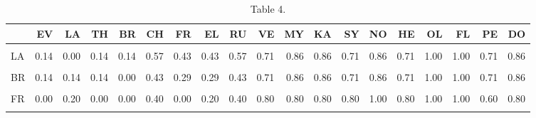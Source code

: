\begin{table}[H]

\caption{Table 4.}
\centering
\fontsize{8}{10}\selectfont
\begin{tabular}[t]{lrrrrrrrrrrrrrrrrrr}
\toprule
  & EV & LA & TH & BR & CH & FR & EL & RU & VE & MY & KA & SY & NO & HE & OL & FL & PE & DO\\
\midrule
\cellcolor{gray!6}{EV} & \cellcolor{gray!6}{0.00} & \cellcolor{gray!6}{0.25} & \cellcolor{gray!6}{0.12} & \cellcolor{gray!6}{0.25} & \cellcolor{gray!6}{0.62} & \cellcolor{gray!6}{0.38} & \cellcolor{gray!6}{0.50} & \cellcolor{gray!6}{0.50} & \cellcolor{gray!6}{0.75} & \cellcolor{gray!6}{0.75} & \cellcolor{gray!6}{0.75} & \cellcolor{gray!6}{0.75} & \cellcolor{gray!6}{0.88} & \cellcolor{gray!6}{0.88} & \cellcolor{gray!6}{0.88} & \cellcolor{gray!6}{0.88} & \cellcolor{gray!6}{0.62} & \cellcolor{gray!6}{0.75}\\
LA & 0.14 & 0.00 & 0.14 & 0.14 & 0.57 & 0.43 & 0.43 & 0.57 & 0.71 & 0.86 & 0.86 & 0.71 & 0.86 & 0.71 & 1.00 & 1.00 & 0.71 & 0.86\\
\cellcolor{gray!6}{TH} & \cellcolor{gray!6}{0.12} & \cellcolor{gray!6}{0.25} & \cellcolor{gray!6}{0.00} & \cellcolor{gray!6}{0.25} & \cellcolor{gray!6}{0.50} & \cellcolor{gray!6}{0.38} & \cellcolor{gray!6}{0.38} & \cellcolor{gray!6}{0.38} & \cellcolor{gray!6}{0.62} & \cellcolor{gray!6}{0.75} & \cellcolor{gray!6}{0.75} & \cellcolor{gray!6}{0.62} & \cellcolor{gray!6}{0.75} & \cellcolor{gray!6}{0.75} & \cellcolor{gray!6}{0.88} & \cellcolor{gray!6}{0.88} & \cellcolor{gray!6}{0.62} & \cellcolor{gray!6}{0.75}\\
BR & 0.14 & 0.14 & 0.14 & 0.00 & 0.43 & 0.29 & 0.29 & 0.43 & 0.71 & 0.86 & 0.86 & 0.71 & 0.86 & 0.71 & 1.00 & 1.00 & 0.71 & 0.86\\
\cellcolor{gray!6}{CH} & \cellcolor{gray!6}{0.25} & \cellcolor{gray!6}{0.25} & \cellcolor{gray!6}{0.00} & \cellcolor{gray!6}{0.00} & \cellcolor{gray!6}{0.00} & \cellcolor{gray!6}{0.25} & \cellcolor{gray!6}{0.25} & \cellcolor{gray!6}{0.25} & \cellcolor{gray!6}{0.75} & \cellcolor{gray!6}{1.00} & \cellcolor{gray!6}{1.00} & \cellcolor{gray!6}{0.75} & \cellcolor{gray!6}{0.75} & \cellcolor{gray!6}{0.75} & \cellcolor{gray!6}{1.00} & \cellcolor{gray!6}{1.00} & \cellcolor{gray!6}{1.00} & \cellcolor{gray!6}{1.00}\\
\addlinespace
FR & 0.00 & 0.20 & 0.00 & 0.00 & 0.40 & 0.00 & 0.20 & 0.40 & 0.80 & 0.80 & 0.80 & 0.80 & 1.00 & 0.80 & 1.00 & 1.00 & 0.60 & 0.80\\
\cellcolor{gray!6}{EL} & \cellcolor{gray!6}{0.20} & \cellcolor{gray!6}{0.20} & \cellcolor{gray!6}{0.00} & \cellcolor{gray!6}{0.00} & \cellcolor{gray!6}{0.40} & \cellcolor{gray!6}{0.20} & \cellcolor{gray!6}{0.00} & \cellcolor{gray!6}{0.20} & \cellcolor{gray!6}{0.60} & \cellcolor{gray!6}{0.80} & \cellcolor{gray!6}{0.80} & \cellcolor{gray!6}{0.60} & \cellcolor{gray!6}{0.80} & \cellcolor{gray!6}{0.60} & \cellcolor{gray!6}{1.00} & \cellcolor{gray!6}{1.00} & \cellcolor{gray!6}{0.60} & \cellcolor{gray!6}{0.80}\\

\end{tabular}
\end{table}
